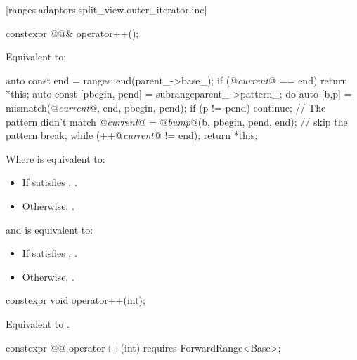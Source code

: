 [ranges.adaptors.split_view.outer_iterator.inc]{}

%
\begin{itemdecl}
constexpr @@& operator++();
\end{itemdecl}

\begin{itemdescr}
\pnum
\effects Equivalent to:
\begin{codeblock}
auto const end = ranges::end(parent_->base_);
if (@\textit{current}@ == end) return *this;
auto const [pbegin, pend] = subrange{parent_->pattern_};
do {
  auto [b,p] = mismatch(@\textit{current}@, end, pbegin, pend);
  if (p != pend) continue; // The pattern didn't match
  @\textit{current}@ = @\textit{bump}@(b, pbegin, pend, end); // skip the pattern
  break;
} while (++@\textit{current}@ != end);
return *this;
\end{codeblock}
\end{itemdescr}

Where  is equivalent to:
\begin{itemize}
\item If  satisfies , .
\item Otherwise, .
\end{itemize}

and  is equivalent to:
\begin{itemize}
\item If  satisfies , .
\item Otherwise, .
\end{itemize}

%
\begin{itemdecl}
constexpr void operator++(int);
\end{itemdecl}

\begin{itemdescr}
\pnum
\effects Equivalent to .
\end{itemdescr}

%
\begin{itemdecl}
constexpr @@ operator++(int) requires ForwardRange<Base>;
\end{itemdecl}

